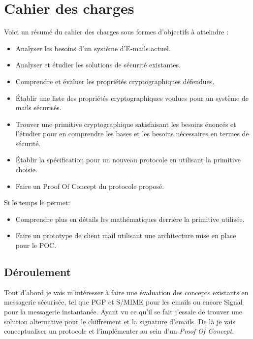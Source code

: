 \section*{Cahier des charges}
Voici un résumé du cahier des charges sous formes d'objectifs à atteindre :
\begin{itemize}
	\item Analyser les besoins d’un système d’E-mails actuel.
	\item Analyser et étudier les solutions de sécurité existantes.
	\item Comprendre et évaluer les propriétés cryptographiques défendues.
	\item Établir une liste des propriétés cryptographiques voulues pour un système de mails sécurisés.
	\item Trouver une primitive cryptographique satisfaisant les besoins énoncés et l’étudier pour en comprendre les bases et les besoins nécessaires en termes de sécurité.
	\item Établir la spécification pour un nouveau protocole en utilisant la primitive choisie.
	\item Faire un Proof Of Concept du protocole proposé.
\end{itemize}

Si le temps le permet: 
\begin{itemize}
	\item Comprendre plus en détails les mathématiques derrière la primitive utilisée.
	\item Faire un prototype de client mail utilisant une architecture mise en place pour le POC.
\end{itemize}


\subsection*{Déroulement}
Tout d'abord je vais m'intéresser à faire une évaluation des concepts existants en messagerie sécurisée, tel que PGP et S/MIME pour les emails ou encore Signal pour la messagerie instantanée. Ayant vu ce qu'il se fait j'essaie de trouver une solution alternative pour le chiffrement et la signature d'emails. De là je vais conceptualiser un protocole et l'implémenter au sein d'un \textit{Proof Of Concept}.

